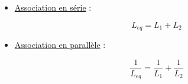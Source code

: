 \begin{itemize}
\item \underline{Association en série} : \\

\begin{center}
\begin{minipage}{.2\textwidth}
\begin{center}

\end{center}
\end{minipage}
\hspace{1cm}
\begin{minipage}{.3\textwidth} 
\begin{equation}
	L_{eq} = L_1 + L_2
\end{equation}
\end{minipage}
\end{center}

\vspace{0.5cm}

\item \underline{Association en parallèle} : \\

\begin{center}
\begin{minipage}{.2\textwidth}
\begin{center}
	
\end{center}
\end{minipage}
\hspace{1cm}
\begin{minipage}{.3\textwidth} 
\begin{equation}
	\dfrac{1}{L_{eq}} = \dfrac{1}{L_1} + \dfrac{1}{L_2}
\end{equation}
\end{minipage}
\end{center}
\end{itemize}



